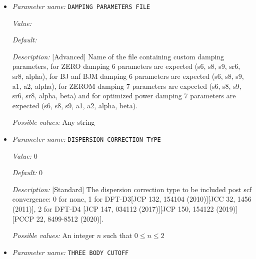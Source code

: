 \begin{itemize}
{\it Value:} false


{\it Default:} false


{\it Description:} [Standard] Boolean parameter specifying whether or not the MBD correction in DFTD4 is to be included (ignored if DAMPING PARAMETERS FILE is specified).


{\it Possible values:} A boolean value (true or false)
\item {\it Parameter name:} {\tt DAMPING PARAMETERS FILE}
\label{parameters:DFT functional parameters/Dispersion Correction/DAMPING PARAMETERS FILE}
\label{parameters:DFT_20functional_20parameters/Dispersion_20Correction/DAMPING_20PARAMETERS_20FILE}


{\it Value:} 


{\it Default:} 


{\it Description:} [Advanced] Name of the file containing custom damping parameters, for ZERO damping 6 parameters are expected (s6, s8, s9, sr6, sr8, alpha), for BJ anf BJM damping 6 parameters are expected (s6, s8, s9, a1, a2, alpha), for ZEROM damping 7 parameters are expected (s6, s8, s9, sr6, sr8, alpha, beta) and for optimized power damping 7 parameters are expected (s6, s8, s9, a1, a2, alpha, beta).


{\it Possible values:} Any string
\item {\it Parameter name:} {\tt DISPERSION CORRECTION TYPE}
\label{parameters:DFT functional parameters/Dispersion Correction/DISPERSION CORRECTION TYPE}
\label{parameters:DFT_20functional_20parameters/Dispersion_20Correction/DISPERSION_20CORRECTION_20TYPE}


{\it Value:} 0


{\it Default:} 0


{\it Description:} [Standard] The dispersion correction type to be included post scf convergence: 0 for none, 1 for DFT-D3[JCP 132, 154104 (2010)][JCC 32, 1456 (2011)], 2 for DFT-D4 [JCP 147, 034112 (2017)][JCP 150, 154122 (2019)][PCCP 22, 8499-8512 (2020)].


{\it Possible values:} An integer $n$ such that $0\leq n \leq 2$
\item {\it Parameter name:} {\tt THREE BODY CUTOFF}
\label{parameters:DFT functional parameters/Dispersion Correction/THREE BODY CUTOFF}
\label{parameters:DFT_20functional_20parameters/Dispersion_20Correction/THREE_20BODY_20CUTOFF}



\end{itemize}
